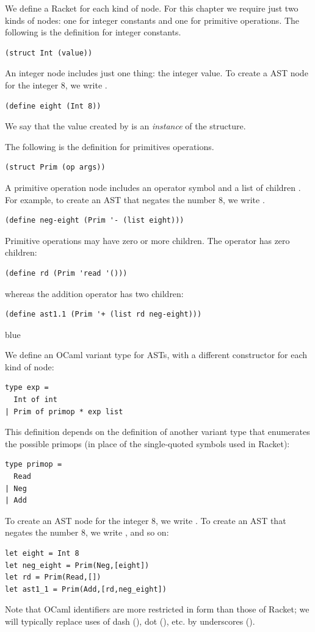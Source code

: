 \documentclass[11pt]{book}
\newenvironment{ocamlx}{
  \begin{color}{blue}
}
{
  \end{color}
}
\begin{document}
We define a Racket  for each kind of node. For this
chapter we require just two kinds of nodes: one for integer constants
and one for primitive operations. The following is the 
definition for integer constants.
\begin{lstlisting}
(struct Int (value))
\end{lstlisting}
An integer node includes just one thing: the integer value.
To create a AST node for the integer $8$, we write .
\begin{lstlisting}
(define eight (Int 8))
\end{lstlisting}
We say that the value created by  is an
\emph{instance} of the  structure.

The following is the  definition for primitives operations.
\begin{lstlisting}
(struct Prim (op args))
\end{lstlisting}
A primitive operation node includes an operator symbol 
and a list of children . For example, to create
an AST that negates the number $8$, we write .
\begin{lstlisting}
(define neg-eight (Prim '- (list eight)))
\end{lstlisting}
Primitive operations may have zero or more children. The 
operator has zero children:
\begin{lstlisting}
(define rd (Prim 'read '()))
\end{lstlisting}
whereas the addition operator has two children:
\begin{lstlisting}
(define ast1.1 (Prim '+ (list rd neg-eight)))
\end{lstlisting}
\begin{ocamlx}
We define an OCaml variant type for ASTs, with a different constructor for each
kind of node:
\begin{lstlisting}[style=ocaml]
type exp = 
  Int of int  
| Prim of primop * exp list
\end{lstlisting}
This definition depends on the definition of another variant type that enumerates the possible primops
(in place of the single-quoted symbols used in Racket):
\begin{lstlisting}[style=ocaml]
type primop = 
  Read
| Neg
| Add
\end{lstlisting}
To create an AST node for the integer 8, we write .
To create an AST that negates
the number 8, we write , and so on:
\begin{lstlisting}[style=ocaml]
let eight = Int 8
let neg_eight = Prim(Neg,[eight])
let rd = Prim(Read,[])
let ast1_1 = Prim(Add,[rd,neg_eight])
\end{lstlisting}
Note that OCaml identifiers are more restricted in form than those of Racket; we will typically replace uses of dash (\code{-}), dot (), etc. by underscores (\code{\_}).
\end{ocamlx}
\end{document}
